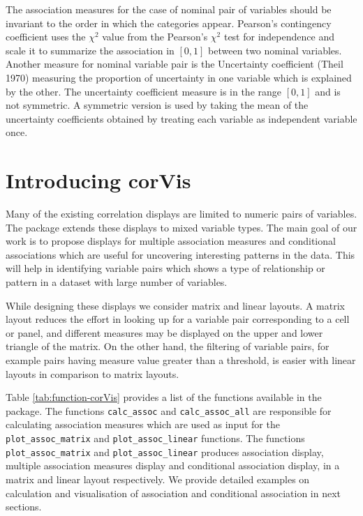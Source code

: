 The association measures for the case of nominal pair of variables should be invariant to the order in which the categories appear. Pearson's contingency coefficient uses the \({\chi}^2\) value from the Pearson's \({\chi}^2\) test for independence and scale it to summarize the association in \([0,1]\) between two nominal variables. Another measure for nominal variable pair is the Uncertainty coefficient (Theil 1970) measuring the proportion of uncertainty in one variable which is explained by the other. The uncertainty coefficient measure is in the range \([0,1]\) and is not symmetric. A symmetric version is used by taking the mean of the uncertainty coefficients obtained by treating each variable as independent variable once.

\hypertarget{introducing-corvis}{%
\section{Introducing corVis}\label{introducing-corvis}}

Many of the existing correlation displays are limited to numeric pairs of variables. The package  extends these displays to mixed variable types. The main goal of our work is to propose displays for multiple association measures and conditional associations which are useful for uncovering interesting patterns in the data. This will help in identifying variable pairs which shows a type of relationship or pattern in a dataset with large number of variables.

While designing these displays we consider matrix and linear layouts. A matrix layout reduces the effort in looking up for a variable pair corresponding to a cell or panel, and different measures may be displayed on the upper and lower triangle of the matrix. On the other hand, the filtering of variable pairs, for example pairs having measure value greater than a threshold, is easier with linear layouts in comparison to matrix layouts.

Table \ref{tab:function-corVis} provides a list of the functions available in the package. The functions \texttt{calc\_assoc} and \texttt{calc\_assoc\_all} are responsible for calculating association measures which are used as input for the \texttt{plot\_assoc\_matrix} and \texttt{plot\_assoc\_linear} functions. The functions \texttt{plot\_assoc\_matrix} and \texttt{plot\_assoc\_linear} produces association display, multiple association measures display and conditional association display, in a matrix and linear layout respectively. We provide detailed examples on calculation and visualisation of association and conditional association in next sections.


